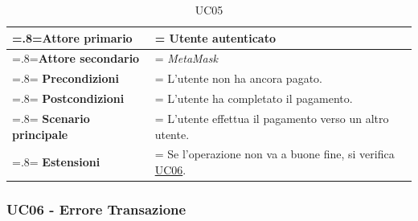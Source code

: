                 \begin{table}[H]
                    \centering
                    \renewcommand{\arraystretch}{1.8}
                    \renewcommand\tabularxcolumn[1]{m{#1}}
                    \begin{tabularx}{0.9\textwidth} {
                        >{\hsize=.8\hsize\linewidth=\hsize}X
                        >{\hsize=1.2\hsize\linewidth=\hsize}X}
                        \hline
                        \textbf{Attore primario} & Utente autenticato \\
                        \hline
                        \textbf{Attore secondario} & \textit{MetaMask} \\
                        \hline
                        \textbf{Precondizioni} & L'utente non ha ancora pagato. \\
                        \hline
                        \textbf{Postcondizioni} & L'utente ha completato il pagamento. \\
                        \hline
                        \textbf{Scenario principale} & L'utente effettua il pagamento verso un altro utente. \\
                        \hline
                        \textbf{Estensioni} & Se l'operazione non va a buone fine, si verifica \hyperref[UC06]{UC06}.\\
                        \hline
                    \end{tabularx}
                    \caption{UC05}
                \end{table}

            \subsubsection{UC06 - Errore Transazione}
            \label{UC06}
    
